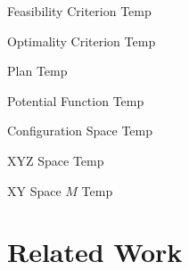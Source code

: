 \begin{definition}{Feasibility Criterion}
Temp
\end{definition}

\begin{definition}{Optimality Criterion}
Temp
\end{definition}

\begin{definition}{Plan}
Temp
\end{definition}

\begin{definition}{Potential Function}
Temp
\end{definition}

\begin{definition}{Configuration Space}
Temp
\end{definition}

\begin{definition}{XYZ Space}
Temp
\end{definition}

\begin{definition}{XY Space $M$}
Temp
\end{definition}

\chapter{Related Work}

